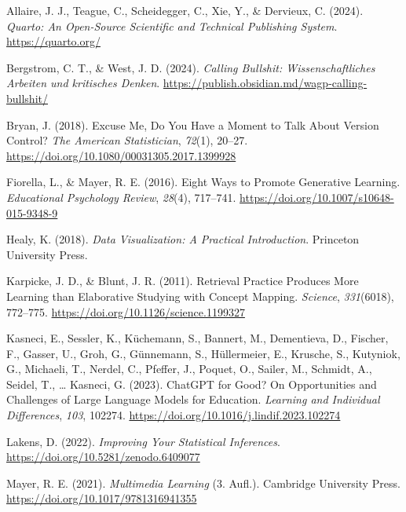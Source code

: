 \documentclass[
  ngerman,
  a4paper,
  DIV=11]{scrreprt}
\newlength{\cslhangindent}
\newenvironment{CSLReferences}[2] %
 {\begin{list}{}{%
  \setlength{\itemindent}{0pt}
  \setlength{\leftmargin}{0pt}
  \setlength{\parsep}{0pt}
  \ifodd #1
   \setlength{\leftmargin}{\cslhangindent}
   \setlength{\itemindent}{-1\cslhangindent}
  \fi
  \setlength{\itemsep}{#2\baselineskip}}}
 {\end{list}}
\begin{document}
\label{refs}
\begin{CSLReferences}{1}{0}
Allaire, J. J., Teague, C., Scheidegger, C., Xie, Y., \& Dervieux, C.
(2024). \emph{Quarto: An Open-Source Scientific and Technical Publishing
System}. \url{https://quarto.org/}

Bergstrom, C. T., \& West, J. D. (2024). \emph{Calling Bullshit:
Wissenschaftliches Arbeiten und kritisches Denken}.
\url{https://publish.obsidian.md/wagp-calling-bullshit/}

Bryan, J. (2018). Excuse Me, Do You Have a Moment to Talk About Version
Control? \emph{The American Statistician}, \emph{72}(1), 20--27.
\url{https://doi.org/10.1080/00031305.2017.1399928}

Fiorella, L., \& Mayer, R. E. (2016). Eight Ways to Promote Generative
Learning. \emph{Educational Psychology Review}, \emph{28}(4), 717--741.
\url{https://doi.org/10.1007/s10648-015-9348-9}

Healy, K. (2018). \emph{Data Visualization: A Practical Introduction}.
Princeton University Press.

Karpicke, J. D., \& Blunt, J. R. (2011). Retrieval Practice Produces
More Learning than Elaborative Studying with Concept Mapping.
\emph{Science}, \emph{331}(6018), 772--775.
\url{https://doi.org/10.1126/science.1199327}

Kasneci, E., Sessler, K., Küchemann, S., Bannert, M., Dementieva, D.,
Fischer, F., Gasser, U., Groh, G., Günnemann, S., Hüllermeier, E.,
Krusche, S., Kutyniok, G., Michaeli, T., Nerdel, C., Pfeffer, J.,
Poquet, O., Sailer, M., Schmidt, A., Seidel, T., \ldots{} Kasneci, G.
(2023). {ChatGPT} for Good? On Opportunities and Challenges of Large
Language Models for Education. \emph{Learning and Individual
Differences}, \emph{103}, 102274.
\url{https://doi.org/10.1016/j.lindif.2023.102274}

Lakens, D. (2022). \emph{Improving Your Statistical Inferences}.
\url{https://doi.org/10.5281/zenodo.6409077}

Mayer, R. E. (2021). \emph{Multimedia Learning} (3. Aufl.). Cambridge
University Press. \url{https://doi.org/10.1017/9781316941355}


\end{CSLReferences}
\end{document}
